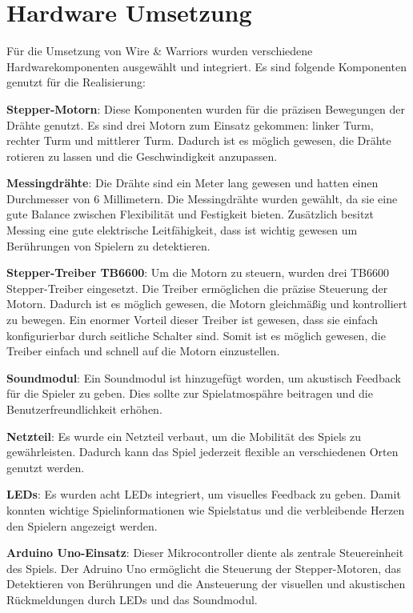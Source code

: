 \chapter{Hardware Umsetzung}

Für die Umsetzung von Wire \& Warriors wurden verschiedene Hardwarekomponenten ausgewählt und integriert. Es sind folgende Komponenten genutzt für die Realisierung:

\textbf{Stepper-Motorn}: Diese Komponenten wurden für die präzisen Bewegungen der Drähte genutzt. Es sind drei Motorn\cite{Tronxy3DPrinter2023} zum Einsatz gekommen: linker Turm, rechter Turm und mittlerer Turm. Dadurch ist es möglich gewesen, die Drähte rotieren zu lassen und die Geschwindigkeit anzupassen.

\textbf{Messingdrähte}: Die Drähte\cite{hagebauGAHALBERTSRundstange2023} sind ein Meter lang gewesen und hatten einen Durchmesser von 6 Millimetern. Die Messingdrähte wurden gewählt, da sie eine gute Balance zwischen Flexibilität und Festigkeit bieten. Zusätzlich besitzt Messing eine gute elektrische Leitfähigkeit, dass ist wichtig gewesen um Berührungen von Spielern zu detektieren.

\textbf{Stepper-Treiber TB6600}: Um die Motorn zu steuern, wurden drei TB6600 Stepper-Treiber\cite{dfrobotTB6600_Stepper_Motor_Driver_SKU__DRI0043DFRobot2023} eingesetzt. Die Treiber ermöglichen die präzise Steuerung der Motorn. Dadurch ist es möglich gewesen, die Motorn gleichmäßig und kontrolliert zu bewegen. Ein enormer Vorteil dieser Treiber ist gewesen, dass sie einfach konfigurierbar durch seitliche Schalter sind. Somit ist es möglich gewesen, die Treiber einfach und schnell auf die Motorn einzustellen.

\textbf{Soundmodul}: Ein Soundmodul ist hinzugefügt worden, um akustisch Feedback für die Spieler zu geben. Dies sollte zur Spielatmospähre beitragen und die Benutzerfreundlichkeit erhöhen.

\textbf{Netzteil}: Es wurde ein Netzteil verbaut, um die Mobilität des Spiels zu gewährleisten. Dadurch kann das Spiel jederzeit flexible an verschiedenen Orten genutzt werden.

\textbf{LEDs}: Es wurden acht LEDs integriert, um visuelles Feedback zu geben. Damit konnten wichtige Spielinformationen wie Spielstatus und die verbleibende Herzen den Spielern angezeigt werden.


\textbf{Arduino Uno-Einsatz}: Dieser Mikrocontroller diente als zentrale Steuereinheit des Spiels. Der Adruino Uno ermöglicht die Steuerung der Stepper-Motoren, das Detektieren von Berührungen und die Ansteuerung der visuellen und akustischen Rückmeldungen durch LEDs und das Soundmodul.

